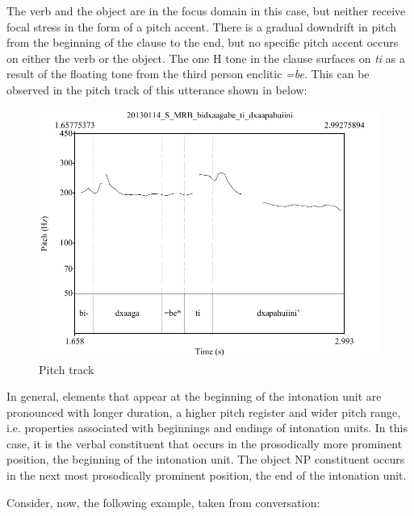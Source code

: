 The verb and the object are in the focus domain in this case, but neither receive focal stress in the form of a pitch accent. There is a gradual downdrift in pitch from the beginning of the clause to the end, but no specific pitch accent occurs on either the verb or the object. The one H tone in the clause surfaces on \textit{ti} as a result of the floating tone from the third person enclitic \textit{=be}. This can be observed in the pitch track of this utterance shown in  below:

\begin{figure} 
\caption{Pitch track}
\label{fig:5:dxaapahuiini}
\includegraphics[height=.4\textheight]{dxaapahuiini}
\end{figure}


In general, elements that appear at the beginning of the intonation unit are pronounced with longer duration, a higher pitch register and wider pitch range, i.e. properties associated with beginnings and endings of intonation units. In this case, it is the verbal constituent that occurs in the prosodically more prominent position, the beginning of the intonation unit. The object NP constituent occurs in the next most prosodically prominent position, the end of the intonation unit.

Consider, now, the following example, taken from conversation:

